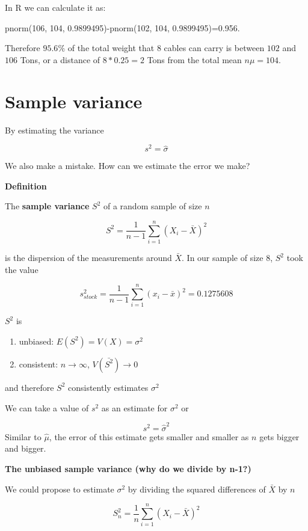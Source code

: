 \documentclass[
]{book}
\providecommand{\tightlist}{%
  \setlength{\itemsep}{0pt}\setlength{\parskip}{0pt}}
\begin{document}
In R we can calculate it as:

pnorm(106, 104, 0.9899495)-pnorm(102, 104, 0.9899495)=0.956.

Therefore \(95.6\%\) of the total weight that \(8\) cables can carry is between \(102\) and \(106\) Tons, or a distance of \(8*0.25=2\) Tons from the total mean \(n\mu=104\).

\hypertarget{sample-variance-1}{%
\section{Sample variance}\label{sample-variance-1}}

By estimating the variance

\[s^2=\hat{\sigma}\]

We also make a mistake. How can we estimate the error we make?

\textbf{Definition}

The \textbf{sample variance} \(S^2\) of a random sample of size \(n\)

\[S^2= \frac{1}{n-1}\sum_{i=1}^n(X_i-\bar{X})^2\]

is the dispersion of the measurements around \(\bar{X}\). In our sample of size \(8\), \(S^2\) took the value

\[s_{stock}^2=\frac{1}{n-1}\sum_{i=1}^n(x_i-\bar{x})^2=0.1275608\]

\(S^2\) is

\begin{enumerate}
\def\labelenumi{\arabic{enumi})}
\tightlist
\item
  unbiased: \(E(S^2)=V(X)=\sigma^2\)
\item
  consistent: \(n \rightarrow \infty\), \(V(\bar{S^2}) \rightarrow 0\)
\end{enumerate}

and therefore \(S^2\) consistently estimates \(\sigma^2\)

We can take a value of \(s^2\) as an estimate for \(\sigma^2\) or

\[s^2=\hat{\sigma}^2\]
Similar to \(\hat{\mu}\), the error of this estimate gets smaller and smaller as \(n\) gets bigger and bigger.

\textbf{The unbiased sample variance (why do we divide by n-1?)}

We could propose to estimate \(\sigma^2\) by dividing the squared differences of \(\bar{X}\) by \(n\)

\[S_n^2=\frac{1}{n}\sum_{i=1}^n(X_i-\bar{X})^2\]
\end{document}

